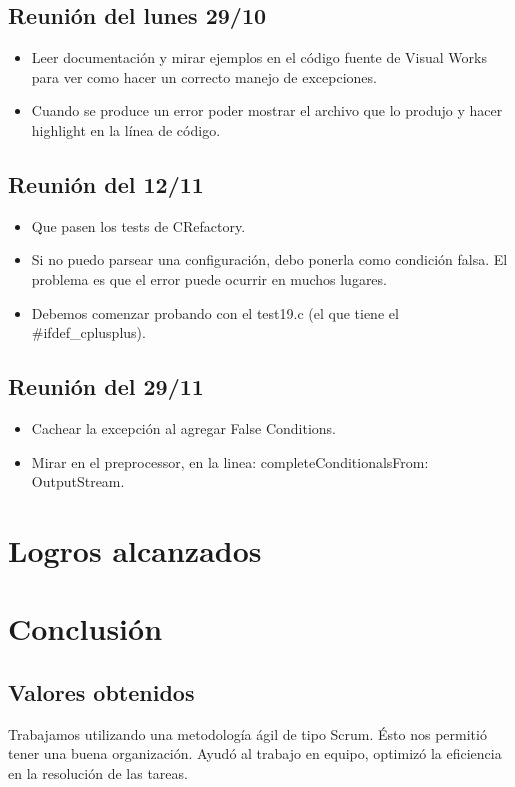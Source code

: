 \documentclass[a4paper,oneside,10pt]{article}
\begin{document}
\subsection{Reunión del lunes 29/10}
\begin{itemize}
 \item Leer documentación y mirar ejemplos en el código fuente de Visual Works para ver como hacer un correcto manejo de excepciones.
 \item Cuando se produce un error poder mostrar el archivo que lo produjo y hacer highlight en la línea de código.
\end{itemize}

\subsection{Reunión del 12/11}
\begin{itemize}
\item Que pasen los tests de CRefactory.
\item Si no puedo parsear una configuración, debo ponerla como condición falsa.  El problema es que el error puede ocurrir en muchos lugares.\item Debemos comenzar probando con el test19.c (el que tiene el \#ifdef\_cplusplus).
\end{itemize}

\subsection{Reunión del 29/11}
\begin{itemize}
\item Cachear la excepción al agregar False Conditions. 
\item Mirar en el preprocessor, en la linea: completeConditionalsFrom: OutputStream.
\end{itemize}

\section{Logros alcanzados}

\section{Conclusi\'on}

\subsection{Valores obtenidos}
Trabajamos utilizando una metodología ágil de tipo Scrum. Ésto nos permitió tener una buena organización. Ayudó al trabajo en equipo, optimizó la eficiencia en la resolución de las tareas.
\end{document}
